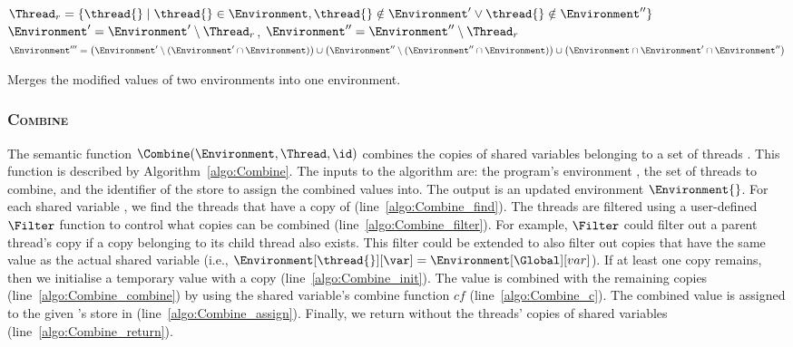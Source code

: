 \begin{algorithm}[t]
	\begin{algorithmic}[1]
			\State $\Thread_r = \lbrace \thread{} \mid \thread{} \in \Environment, \thread{} \notin \Environment' \vee \thread{} \notin \Environment'' \rbrace$	\label{algo:Merge_remove1}
			\State $\Environment' = \Environment' \setminus \Thread_r$, $\Environment'' = \Environment'' \setminus \Thread_r$						\label{algo:Merge_remove2}
			\State \Return $\Environment''' = \left ( \Environment' \setminus (\Environment' \cap \Environment) \right ) \cup \left ( \Environment'' \setminus (\Environment'' \cap \Environment) \right ) \cup \left ( \Environment \cap \Environment' \cap \Environment'' \right )$	\label{algo:Merge_merge}
		\EndFunction
	\end{algorithmic}
	
	\caption{Merges the modified values of two environments into one environment.}
	\label{algo:Merge}
\end{algorithm}

\subsubsection{\textsc{Combine}}
\label{sec:forec_Combine}
The semantic function $\Combine(\Environment, \Thread, \id)$ 
combines the copies of shared variables belonging to a set of threads \Thread{}. 
This function is described by Algorithm~\ref{algo:Combine}. The inputs
to the algorithm are: the program's environment \Environment{},
the set of threads \Thread{} to combine, and the 
identifier \id{} of the store to assign the combined
values into. The output is an updated environment $\Environment{}$.
For each shared variable \var{}, we find the threads that 
have a copy of \var{} (line~\ref{algo:Combine_find}). 
The threads are filtered using a user-defined $\Filter$ 
function to control what copies can be combined 
(line~\ref{algo:Combine_filter}). 
For example, $\Filter$ could filter out a parent thread's 
copy if a copy belonging to its child thread also exists.
This filter could be extended to also filter out 
copies that have the same value as the actual
shared variable (i.e., $\Environment[\thread{}][\var] = \Environment[\Global][var]$).
If at least one copy remains, then we initialise 
a temporary value \val{} with a copy (line~\ref{algo:Combine_init}). 
The value is combined with the remaining copies (line~\ref{algo:Combine_combine}) 
by using the shared variable's combine function $cf$ 
(line~\ref{algo:Combine_c}). The combined value is assigned 
to the given \id{}'s store in \Environment{}
(line~\ref{algo:Combine_assign}). Finally, we return \Environment{} 
without the threads' copies of shared variables (line~\ref{algo:Combine_return}).

